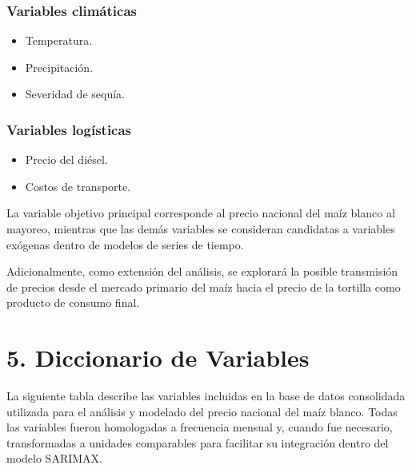 \documentclass[11pt]{article}
\providecommand{\tightlist}{%
      \setlength{\itemsep}{0pt}\setlength{\parskip}{0pt}}
\begin{document}
\hypertarget{variables-climuxe1ticas}{%
\subsubsection{Variables climáticas}\label{variables-climuxe1ticas}}

\begin{itemize}
\tightlist
\item
  Temperatura.
\item
  Precipitación.
\item
  Severidad de sequía.
\end{itemize}

\hypertarget{variables-loguxedsticas}{%
\subsubsection{Variables logísticas}\label{variables-loguxedsticas}}

\begin{itemize}
\tightlist
\item
  Precio del diésel.
\item
  Costos de transporte.
\end{itemize}

La variable objetivo principal corresponde al precio nacional del maíz
blanco al mayoreo, mientras que las demás variables se consideran
candidatas a variables exógenas dentro de modelos de series de tiempo.

Adicionalmente, como extensión del análisis, se explorará la posible
transmisión de precios desde el mercado primario del maíz hacia el
precio de la tortilla como producto de consumo final.

    \hypertarget{diccionario-de-variables}{%
\section{5. Diccionario de Variables}\label{diccionario-de-variables}}

La siguiente tabla describe las variables incluidas en la base de datos
consolidada utilizada para el análisis y modelado del precio nacional
del maíz blanco. Todas las variables fueron homologadas a frecuencia
mensual y, cuando fue necesario, transformadas a unidades comparables
para facilitar su integración dentro del modelo SARIMAX.
\end{document}

